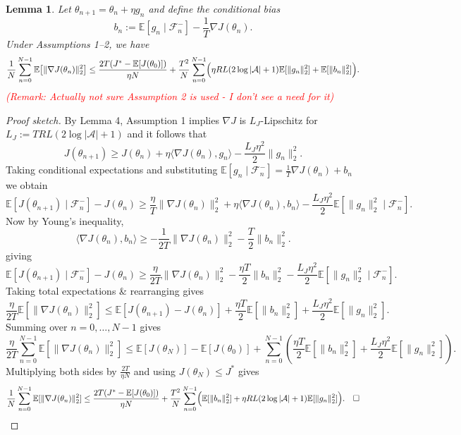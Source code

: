 \documentclass[10pt]{article}
\newcommand{\E}{\mathbb{E}}
\newcommand{\F}{\mathcal{F}}
\newcommand{\grad}{\nabla}
\theoremstyle{preserved}
\newtheorem{lemma}{Lemma}
\begin{document}
\begin{lemma} Let $\theta_{n+1}=\theta_n+\eta g_n$ and define the conditional bias
\begin{equation*}
b_n:=\E[g_n\mid\F_n^-]-\frac1T\grad J(\theta_n).
\end{equation*}
Under Assumptions 1--2, we have 
\begin{equation*}
\frac1N\sum_{n=0}^{N-1}\E\bigl[\|\grad J(\theta_n)\|_2^2\bigr]
\le\frac{2T(J^*-\E[J(\theta_0)])}{\eta N}
+\frac{T^2}{N}\sum_{n=0}^{N-1}\Bigl(\eta RL(2\log|\mathcal A|+1)\E[\|g_n\|_2^2]+\E[\|b_n\|_2^2]\Bigr).
\end{equation*}
\textcolor{red}{(Remark: Actually not sure Assumption 2 is used - I don't see a need for it)}
\end{lemma}
\begin{proof}[Proof sketch]

By Lemma 4, Assumption 1 implies $\grad J$ is $L_J$-Lipschitz for $L_J:=TRL(2\log|\mathcal A|+1)$ and it follows that
\begin{equation*}
J(\theta_{n+1})\ge J(\theta_n)+\eta\langle\grad J(\theta_n),g_n\rangle-\frac{L_J\eta^2}{2}\|g_n\|_2^2.
\end{equation*}
Taking conditional expectations and substituting $\E[g_n\mid\F_n^-]=\frac1T\grad J(\theta_n)+b_n$ we obtain
\begin{equation*}
\E[J(\theta_{n+1})\mid\F_n^-]-J(\theta_n)
\ge\frac\eta T\|\grad J(\theta_n)\|_2^2+\eta\langle\grad J(\theta_n),b_n\rangle
-\frac{L_J\eta^2}{2}\E[\|g_n\|_2^2\mid\F_n^-].
\end{equation*}
Now by Young's inequality,
\begin{equation*}
\langle\grad J(\theta_n),b_n\rangle\ge-\frac1{2T}\|\grad J(\theta_n)\|_2^2-\frac T2\|b_n\|_2^2.
\end{equation*}
giving
\begin{equation*}
\E[J(\theta_{n+1})\mid\F_n^-]-J(\theta_n)
\ge\frac\eta{2T}\|\grad J(\theta_n)\|_2^2-\frac{\eta T}{2}\|b_n\|_2^2
-\frac{L_J\eta^2}{2}\E[\|g_n\|_2^2\mid\F_n^-].
\end{equation*}
Taking total expectations \& rearranging gives
\begin{equation*}
\frac\eta{2T}\E[\|\grad J(\theta_n)\|_2^2]
\le\E[J(\theta_{n+1})-J(\theta_n)]+\frac{\eta T}{2}\E[\|b_n\|_2^2]+\frac{L_J\eta^2}{2}\E[\|g_n\|_2^2].
\end{equation*}
Summing over $n=0,\ldots,N-1$ gives
\begin{equation*}
\frac\eta{2T}\sum_{n=0}^{N-1}\E[\|\grad J(\theta_n)\|_2^2]
\le\E[J(\theta_N)]-\E[J(\theta_0)]
+\sum_{n=0}^{N-1}\left(\frac{\eta T}{2}\E[\|b_n\|_2^2]+\frac{L_J\eta^2}{2}\E[\|g_n\|_2^2]\right).
\end{equation*}
Multiplying both sides by $\frac{2T}{\eta N}$ and using $J(\theta_N)\le J^*$ gives
\begin{equation*}
\frac1N\sum_{n=0}^{N-1}\E[\|\grad J(\theta_n)\|_2^2]
\le\frac{2T(J^*-\E[J(\theta_0)])}{\eta N}
+\frac{T^2}{N}\sum_{n=0}^{N-1}\Bigl(\E[\|b_n\|_2^2]+\eta RL(2\log|\mathcal A|+1)\E[\|g_n\|_2^2]\Bigr).\quad\square
\end{equation*}

\end{proof}
\end{document}
